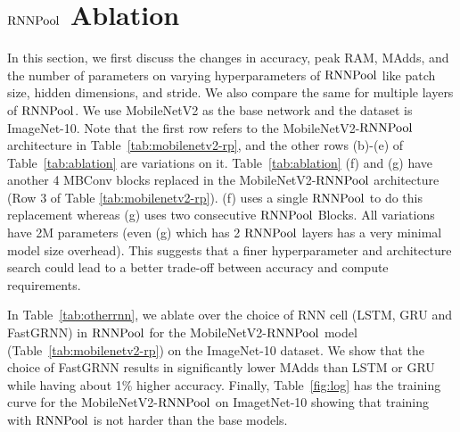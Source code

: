 \documentclass[10pt]{article}
\newcommand{\rpool}{\ensuremath{{\rm RNNPool}}\xspace}
\begin{document}
 \section{\rpool Ablation}
\label{sec:ablation}
In this section, we first discuss the changes in accuracy, peak RAM, MAdds, and the number of parameters on varying hyperparameters of \rpool like patch size, hidden dimensions, and stride. We also compare the same for multiple layers of \rpool. We use MobileNetV2 as the base network and the dataset is ImageNet-10. Note that the first row refers to the MobileNetV2-\rpool architecture in Table~\ref{tab:mobilenetv2-rp}, and the other rows (b)-(e) of Table~\ref{tab:ablation} are variations on it. Table~\ref{tab:ablation} (f) and (g) have another 4 MBConv blocks replaced in the MobileNetV2-\rpool architecture (Row 3 of Table \ref{tab:mobilenetv2-rp}). (f) uses a single \rpool to do this replacement whereas (g) uses two consecutive \rpool Blocks. All variations have 2M parameters (even (g) which has 2 \rpool layers has a very minimal model size overhead). This suggests that a finer hyperparameter and architecture search could lead to a better trade-off between accuracy and compute requirements.
\begin{table}[h]
\centering
    \caption{\small Comparison of accuracy, peak RAM and MAdds for variations in hidden dimensions, patch size and stride in RNNPool for MobileNetV2 and on ImageNet-10 dataset. Parameters are same as the base if not mentioned. (f) and (g) are further replacements in MobileNetV2-\rpool (Row 3 of Table~\ref{tab:mobilenetv2-rp}).}
\label{tab:ablation}
\end{table} 
In Table~\ref{tab:otherrnn}, we ablate over the choice of RNN cell (LSTM, GRU and FastGRNN) in \rpool for the MobileNetV2-\rpool model (Table~\ref{tab:mobilenetv2-rp}) on the ImageNet-10 dataset. We show that the choice of FastGRNN results in significantly lower MAdds than LSTM or GRU while having about 1\% higher accuracy. Finally, Table~\ref{fig:log} has the training curve for the MobileNetV2-\rpool on ImagetNet-10 showing that training with \rpool is not harder than the base models.
\end{document}
